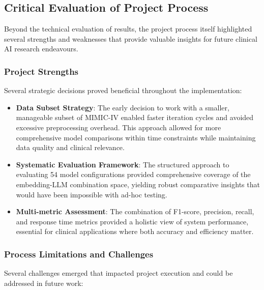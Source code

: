 \subsection{Critical Evaluation of Project Process}

Beyond the technical evaluation of results, the project process itself highlighted several strengths and weaknesses that provide valuable insights for future clinical AI research endeavours.

\subsubsection{Project Strengths}

Several strategic decisions proved beneficial throughout the implementation:

\begin{itemize}
    \item \textbf{Data Subset Strategy}: The early decision to work with a smaller, manageable subset of MIMIC-IV enabled faster iteration cycles and avoided excessive preprocessing overhead. This approach allowed for more comprehensive model comparisons within time constraints while maintaining data quality and clinical relevance.
    
    \item \textbf{Systematic Evaluation Framework}: The structured approach to evaluating 54 model configurations provided comprehensive coverage of the embedding-LLM combination space, yielding robust comparative insights that would have been impossible with ad-hoc testing.
    
    \item \textbf{Multi-metric Assessment}: The combination of F1-score, precision, recall, and response time metrics provided a holistic view of system performance, essential for clinical applications where both accuracy and efficiency matter.
\end{itemize}

\subsubsection{Process Limitations and Challenges}

Several challenges emerged that impacted project execution and could be addressed in future work:

